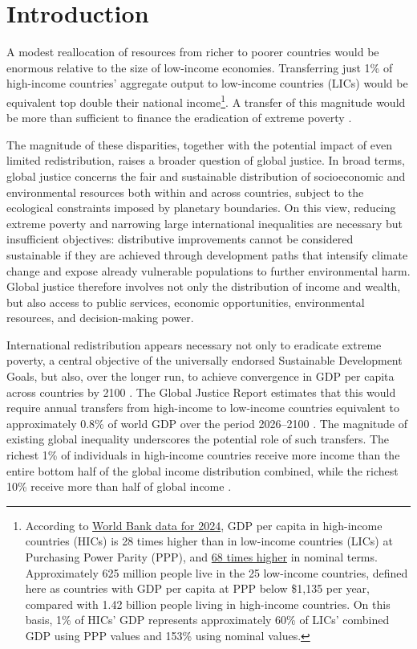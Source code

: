 \documentclass[11pt,a4paper]{article}
\begin{document}
\section*{Introduction}

A modest reallocation of resources from richer to poorer countries would be enormous relative to the size of low-income economies. Transferring just 1\% of high-income countries' aggregate output to low-income countries (LICs) would be equivalent top double their national income\footnote{According to \href{https://data.worldbank.org/indicator/NY.GDP.PCAP.PP.CD?contextual=default&end=2024&locations=EU-ZG-XD-XM-1W-IN-US-CD-BI-LU-CN&start=2024&view=bar}{World Bank data for 2024}, GDP per capita in high-income countries (HICs) is 28 times higher than in low-income countries (LICs) at Purchasing Power Parity (PPP), and \href{https://data.worldbank.org/indicator/NY.GDP.PCAP.CD?end=2024&locations=EU-ZG-XD-XM-1W-IN-US-CD-BI-LU-CN&start=2024&view=bar}{68 times higher} in nominal terms. Approximately 625 million people live in the 25 low-income countries, defined here as countries with GDP per capita at PPP below \$1,135 per year, compared with 1.42 billion people living in high-income countries. On this basis, 1\% of HICs' GDP represents approximately 60\% of LICs' combined GDP using PPP values and 153\% using nominal values.}. A transfer of this magnitude would be more than sufficient to finance the eradication of extreme poverty \citep{sahoo_what_2025}.

The magnitude of these disparities, together with the potential impact of even limited redistribution, raises a broader question of global justice. In broad terms, global justice concerns the fair and sustainable distribution of socioeconomic and environmental resources both within and across countries, subject to the ecological constraints imposed by planetary boundaries. On this view, reducing extreme poverty and narrowing large international inequalities are necessary but insufficient objectives: distributive improvements cannot be considered sustainable if they are achieved through development paths that intensify climate change and expose already vulnerable populations to further environmental harm. Global justice therefore involves not only the distribution of income and wealth, but also access to public services, economic opportunities, environmental resources, and decision-making power.

International redistribution appears necessary not only to eradicate extreme poverty, a central objective of the universally endorsed Sustainable Development Goals, but also, over the longer run, to achieve convergence in GDP per capita across countries by 2100 \citep{fabre_JDS_2025}. The Global Justice Report estimates that this would require annual transfers from high-income to low-income countries equivalent to approximately 0.8\% of world GDP over the period 2026--2100 \citep[Figure~4.2]{bothe_et_al_2026}. The magnitude of existing global inequality underscores the potential role of such transfers. The richest 1\% of individuals in high-income countries receive more income than the entire bottom half of the global income distribution combined, while the richest 10\% receive more than half of global income \citep{chancel_world_2026}.
\end{document}
